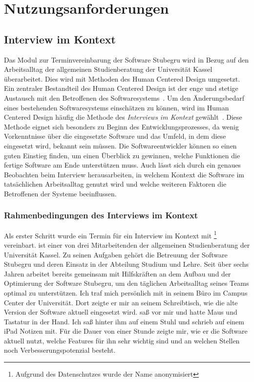 \chapter{Nutzungsanforderungen}
\label{chapter:user-requirements}

\section{Interview im Kontext}
\label{subsection:IIK}

Das Modul zur Terminvereinbarung der Software Stubegru wird in Bezug auf den
Arbeitsalltag der allgemeinen Studienberatung der Universität Kassel
überarbeitet. Dies wird mit Methoden des Human Centered Design umgesetzt. Ein
zentraler Bestandteil des Human Centered Design ist der enge und stetige
Austausch mit den Betroffenen des Softwaresystems~\cite{hci}. Um den
Änderungsbedarf eines bestehenden Softwaresystems einschätzen zu können, wird
im Human Centered Design häufig die Methode des \textit{Interviews im Kontext}
gewählt~\cite{contextualDesign}. Diese Methode eignet sich besonders zu Beginn
des Entwicklungsprozesses, da wenig Vorkenntnisse über die eingesetzte Software
und das Umfeld, in dem diese eingesetzt wird, bekannt sein müssen. Die
Softwareentwickler können so einen guten Einstieg finden, um einen Überblick zu
gewinnen, welche Funktionen die fertige Software am Ende unterstützen muss.
Auch lässt sich durch ein genaues Beobachten beim Interview herausarbeiten, in
welchem Kontext die Software im tatsächlichen Arbeitsalltag genutzt wird und
welche weiteren Faktoren die Betroffenen der Systeme beeinflussen.

\subsection*{Rahmenbedingungen des Interviews im Kontext}
Als erster Schritt wurde ein Termin für ein Interview im Kontext mit
\ipName\footnote{Aufgrund des Datenschutzes wurde der Name anonymisiert}
vereinbart. \ipName ist einer von drei Mitarbeitenden der allgemeinen
Studienberatung der Universität Kassel. Zu seinen Aufgaben gehört die Betreuung
der Software Stubegru und deren Einsatz in der Abteilung Studium und Lehre.
Seit über sechs Jahren arbeitet \ipName bereits gemeinsam mit Hilfskräften an
dem Aufbau und der Optimierung der Software Stubegru, um den täglichen
Arbeitsalltag seines Teams optimal zu unterstützen. Ich traf mich persönlich
mit \ipName in seinem Büro im Campus Center der Universität. Dort zeigte er mir
an seinem Schreibtisch, wie die alte Version der Software
aktuell eingesetzt wird. \ipName saß vor mir und hatte
Maus und Tastatur in der Hand. Ich saß hinter ihm auf einem Stuhl und schrieb
auf einem iPad Notizen mit. Für die Dauer von einer Stunde zeigte \ipName mir,
wie er die Software aktuell nutzt, welche Features für ihn sehr wichtig sind
und an welchen Stellen noch Verbesserungspotenzial besteht.

